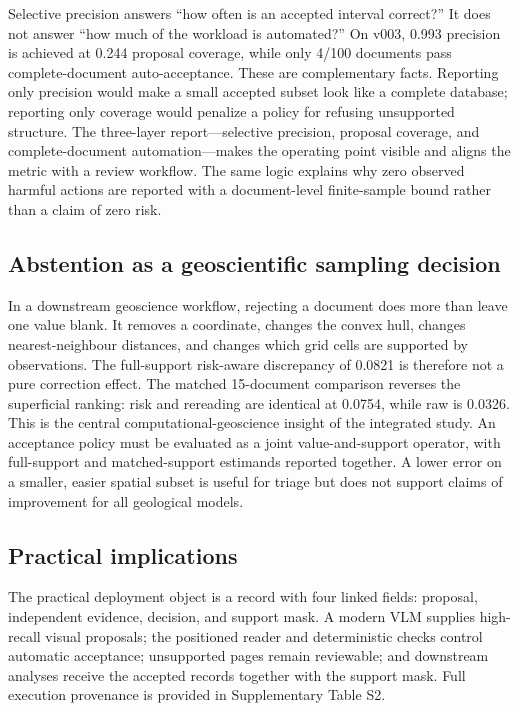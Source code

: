 \documentclass[a4paper,fleqn]{cas-sc}
\begin{document}
Selective precision answers ``how often is an accepted interval correct?'' It does not answer ``how much of the workload is automated?'' On v003, 0.993 precision is achieved at 0.244 proposal coverage, while only 4/100 documents pass complete-document auto-acceptance. These are complementary facts. Reporting only precision would make a small accepted subset look like a complete database; reporting only coverage would penalize a policy for refusing unsupported structure. The three-layer report---selective precision, proposal coverage, and complete-document automation---makes the operating point visible and aligns the metric with a review workflow. The same logic explains why zero observed harmful actions are reported with a document-level finite-sample bound rather than a claim of zero risk.

\subsection{Abstention as a geoscientific sampling decision}

In a downstream geoscience workflow, rejecting a document does more than leave one value blank. It removes a coordinate, changes the convex hull, changes nearest-neighbour distances, and changes which grid cells are supported by observations. The full-support risk-aware discrepancy of 0.0821 is therefore not a pure correction effect. The matched 15-document comparison reverses the superficial ranking: risk and rereading are identical at 0.0754, while raw is 0.0326. This is the central computational-geoscience insight of the integrated study. An acceptance policy must be evaluated as a joint value-and-support operator, with full-support and matched-support estimands reported together. A lower error on a smaller, easier spatial subset is useful for triage but does not support claims of improvement for all geological models.

\subsection{Practical implications}

The practical deployment object is a record with four linked fields: proposal, independent evidence, decision, and support mask. A modern VLM supplies high-recall visual proposals; the positioned reader and deterministic checks control automatic acceptance; unsupported pages remain reviewable; and downstream analyses receive the accepted records together with the support mask. Full execution provenance is provided in Supplementary Table S2.
\end{document}
